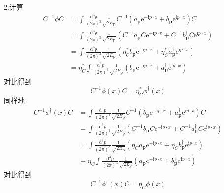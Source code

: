 2.计算
\begin{equation}
    \begin{aligned}
        C^{-1}\phi C&=\int{\frac{\mathrm{d}^3p}{\left( 2\pi \right) ^3}}\frac{1}{\sqrt{2E_{\mathbf{p}}}}C^{-1}\left( a_{\mathbf{p}}\mathrm{e}^{-\mathrm{i}p\cdot x}+b_{\mathbf{p}}^{\dagger}\mathrm{e}^{\mathrm{i}p\cdot x} \right) C
\\
&=\int{\frac{\mathrm{d}^3p}{\left( 2\pi \right) ^3}}\frac{1}{\sqrt{2E_{\mathbf{p}}}}\left( C^{-1}a_{\mathbf{p}}C\mathrm{e}^{-\mathrm{i}p\cdot x}+C^{-1}b_{\mathbf{p}}^{\dagger}C\mathrm{e}^{\mathrm{i}p\cdot x} \right) 
\\
&=\int{\frac{\mathrm{d}^3p}{\left( 2\pi \right) ^3}}\frac{1}{\sqrt{2E_{\mathbf{p}}}}\left( \eta _{C}^{*}b_{\mathbf{p}}\mathrm{e}^{-\mathrm{i}p\cdot x}+\eta _{C}^{*}a_{\mathbf{p}}^{\dagger}\mathrm{e}^{\mathrm{i}p\cdot x} \right) 
\\
&=\eta _{C}^{*}\int{\frac{\mathrm{d}^3p}{\left( 2\pi \right) ^3}}\frac{1}{\sqrt{2E_{\mathbf{p}}}}\left( b_{\mathbf{p}}\mathrm{e}^{-\mathrm{i}p\cdot x}+a_{\mathbf{p}}^{\dagger}\mathrm{e}^{\mathrm{i}p\cdot x} \right) 
    \end{aligned}
\end{equation}
对比得到
\begin{equation}
    C^{-1}\phi (x)C=\eta _{C}^{*}\phi ^{\dagger}(x)
\end{equation}
同样地
\begin{equation}
    \begin{aligned}
        C^{-1}\phi ^{\dagger}(x)C&=\int{\frac{\mathrm{d}^3p}{\left( 2\pi \right) ^3}}\frac{1}{\sqrt{2E_{\mathbf{p}}}}C^{-1}\left( b_{\mathbf{p}}\mathrm{e}^{-\mathrm{i}p\cdot x}+a_{\mathbf{p}}^{\dagger}\mathrm{e}^{\mathrm{i}p\cdot x} \right) C
\\
&=\int{\frac{\mathrm{d}^3p}{\left( 2\pi \right) ^3}}\frac{1}{\sqrt{2E_{\mathbf{p}}}}\left( C^{-1}b_{\mathbf{p}}C\mathrm{e}^{-\mathrm{i}p\cdot x}+C^{-1}a_{\mathbf{p}}^{\dagger}C\mathrm{e}^{\mathrm{i}p\cdot x} \right) 
\\
&=\int{\frac{\mathrm{d}^3p}{\left( 2\pi \right) ^3}}\frac{1}{\sqrt{2E_{\mathbf{p}}}}\left( \eta _Ca_{\mathbf{p}}\mathrm{e}^{-\mathrm{i}p\cdot x}+\eta _Cb_{\mathbf{p}}^{\dagger}\mathrm{e}^{\mathrm{i}p\cdot x} \right) 
\\
&=\eta _C\int{\frac{\mathrm{d}^3p}{\left( 2\pi \right) ^3}}\frac{1}{\sqrt{2E_{\mathbf{p}}}}\left( a_{\mathbf{p}}\mathrm{e}^{-\mathrm{i}p\cdot x}+b_{\mathbf{p}}^{\dagger}\mathrm{e}^{\mathrm{i}p\cdot x} \right) 
    \end{aligned}
\end{equation}
对比得到
\begin{equation}
    C^{-1}\phi ^{\dagger}(x)C=\eta _C\phi (x)
\end{equation}







